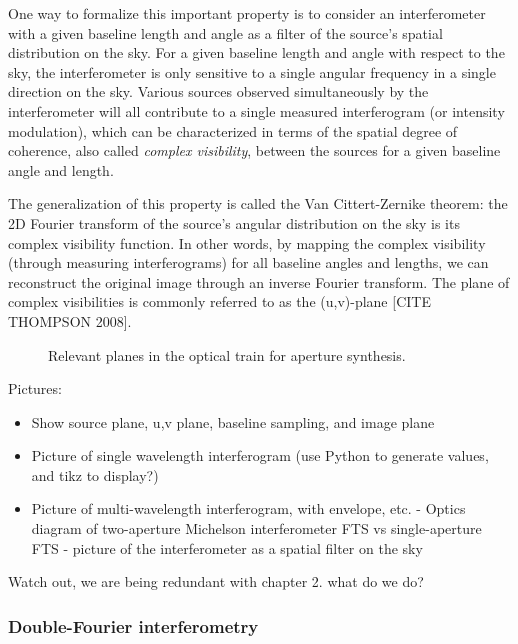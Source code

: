 One way to formalize this important property is to consider an interferometer with a given baseline length and angle as a filter of the source's spatial distribution on the sky. For a given baseline length and angle with respect to the sky, the interferometer is only sensitive to a single angular frequency in a single direction on the sky. Various sources observed simultaneously by the interferometer will all contribute to a single measured interferogram (or intensity modulation), which can be characterized in terms of the spatial degree of coherence, also called \textit{complex visibility}, between the sources for a given baseline angle and length. 

The generalization of this property is called the Van Cittert-Zernike theorem: the 2D Fourier transform of the source's angular distribution on the sky is its complex visibility function. In other words, by mapping the complex visibility (through measuring interferograms) for all baseline angles and lengths, we can reconstruct the original image through an inverse Fourier transform. The plane of complex visibilities is commonly referred to as the (u,v)-plane [CITE THOMPSON 2008].


\begin{figure}[!ht]
	\centering
	
	\caption[Aperture synthesis]{Relevant planes in the optical train for aperture synthesis.}
	\label{fig:aperturesynthesis}
    \end{figure}



Pictures:
\begin{itemize}
\item Show source plane, u,v plane, baseline sampling, and image plane
\item Picture of single wavelength interferogram (use Python to generate values, and tikz to display?)
\item Picture of multi-wavelength interferogram, with envelope, etc.
- Optics diagram of two-aperture Michelson interferometer FTS vs single-aperture FTS
- picture of the interferometer as a spatial filter on the sky
\end{itemize}

Watch out, we are being redundant with chapter 2. what do we do?

\subsubsection{Double-Fourier interferometry}

